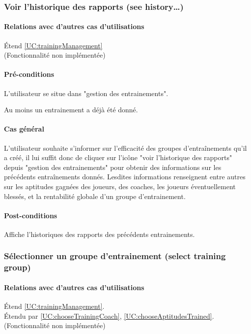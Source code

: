 \subsubsection{Voir l'historique des rapports (see history…)}
\label{UC:TrainingHistory}
\paragraph{Relations avec d'autres cas d'utilisations}
Étend \ref{UC:trainingManagement}
\\(Fonctionnalité non implémentée)
\paragraph{Pré-conditions}
\begin{list}{}{\leftmargin=1.5em}
\item{L'utilisateur se situe dans "gestion des entrainements".}
\item{Au moins un entrainement a déjà été donné.}
\end{list}
\paragraph{Cas général}
L'utilisateur souhaite s'informer sur l'efficacité des groupes d'entraînements qu'il a créé, il lui suffit donc de cliquer sur l'icône "voir l'historique des rapports" depuis "gestion des entrainements" pour obtenir des informations sur les précédents entraînements donnés. Lesdites informations renseignent entre autres sur les aptitudes gagnées des joueurs, des coaches, les joueurs éventuellement blessés, et la rentabilité globale d'un groupe d'entrainement. 
\paragraph{Post-conditions}
\begin{list}{}{\leftmargin=1.5em}
\item{Affiche l'historiques des rapports des précédents entrainements.}
\end{list}

\subsubsection{Sélectionner un groupe d'entrainement (select training group)}
\label{UC:selectTrainingGroup}
\paragraph{Relations avec d'autres cas d'utilisations}
Étend \ref{UC:trainingManagement}.\\
Étendu par \ref{UC:chooseTrainingCoach}, \ref{UC:chooseAptitudesTrained}.
\\(Fonctionnalité non implémentée)
